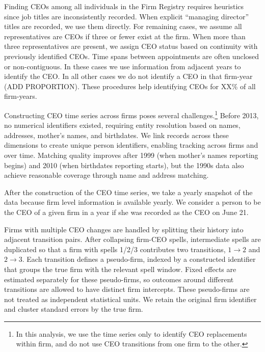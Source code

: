 \documentclass[sigconf,nonacm]{acmart}
\begin{document}
Finding CEOs among all individuals in the Firm Registry requires heuristics since job titles are inconsistently recorded. When explicit “managing director” titles are recorded, we use them directly. For remaining cases, we assume all representatives are CEOs if three or fewer exist at the firm. When more than three representatives are present, we assign CEO status based on continuity with previously identified CEOs. Time spans between appointments are often unclosed or non-contiguous. In these cases we use information from adjacent years to identify the CEO. In all other cases we do not identify a CEO in that firm-year (ADD PROPORTION). These procedures help identifying CEOs for XX\% of all firm-years.

Constructing CEO time series across firms poses several challenges.\footnote{In this analysis, we use the time series only to identify CEO replacements within firm, and do not use CEO transitions from one firm to the other.} Before 2013, no numerical identifiers existed, requiring entity resolution based on names, addresses, mother’s names, and birthdates. We link records across these dimensions to create unique person identifiers, enabling tracking across firms and over time. Matching quality improves after 1999 (when mother’s names reporting begins) and 2010 (when birthdates reporting starts), but the 1990s data also achieve reasonable coverage through name and address matching.

After the construction of the CEO time series, we take a yearly snapshot of the data because firm level information is available yearly. We consider a person to be the CEO of a given firm in a year if she was recorded as the CEO on June 21.

Firms with multiple CEO changes are handled by splitting their history into adjacent transition pairs. After collapsing firm-CEO spells, intermediate spells are duplicated so that a firm with spells 1/2/3 contributes two transitions, $1 \rightarrow 2$ and $2 \rightarrow 3$. Each transition defines a pseudo-firm, indexed by a constructed identifier that groups the true firm with the relevant spell window. Fixed effects are estimated separately for these pseudo-firms, so outcomes around different transitions are allowed to have distinct firm intercepts. These pseudo-firms are not treated as independent statistical units. We retain the original firm identifier and cluster standard errors by the true firm. 
\end{document}
